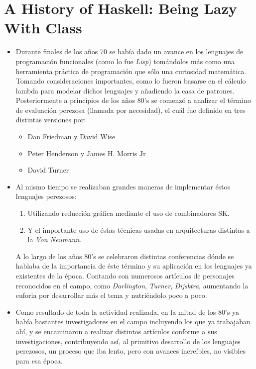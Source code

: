 \documentclass{article}
\begin{document}
\section*{\LARGE{A History of Haskell: Being Lazy With Class}}

\begin{itemize}
	\item Durante finales de los años 70 se había dado un avance en los lenguajes de programación funcionales (como lo fue \textit{Lisp}) tomándolos más como una herramienta práctica de programación que sólo una curiosidad matemática. Tomando consideraciones importantes, como lo fueron basarse en el cálculo lambda para modelar dichos lenguajes y añadiendo la casa de patrones. \\ Posteriormente a principios de los años 80's se comenzó a analizar el término de evaluación perezosa (llamada por necesidad), el cuál fue definido en tres distintas versiones por:
		\begin{itemize}
			\item Dan Friedman y David Wise 
			\item Peter Henderson y James H. Morris Jr
			\item David Turner 
		\end{itemize}
	\item Al mismo tiempo se realizaban grandes maneras de implementar éstos lenguajes perezosos:
			\begin{enumerate}
				\item Utilizando reducción gráfica mediante el uso de combinadores SK.
				\item Y el importante uso de éstas técnicas usadas en arquitecturas distintas a la \textit{Von Neumann}.
			\end{enumerate}
		  A lo largo de los años 80's se celebraron distintas conferencias dónde se hablaba de la importancia de éste término y su aplicación en los lenguajes ya existentes de la época. Contando con numerosos artículos de personajes reconocidos en el campo, como \textit{Darlington}, \textit{Turner}, \textit{Dijsktra}, aumentando la euforia por desarrollar más el tema y nutriéndolo poco a poco.
	\item Como resultado de toda la actividad realizada, en la mitad de los 80's ya había bastantes investigadores en el campo incluyendo los que ya trabajaban ahí, y se encaminaron a realizar distintos artículos conforme a sus investigaciones, contribuyendo así, al primitivo desarrollo de los lenguajes perezosos, un proceso que iba lento, pero con avances increíbles, no visibles para esa época.

\end{itemize}
\end{document}
